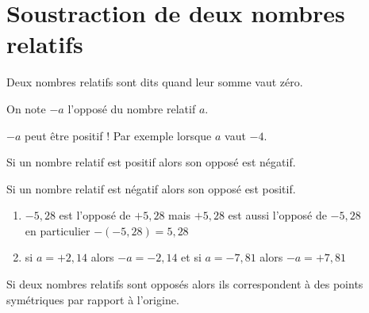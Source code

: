 \section{Soustraction de deux nombres relatifs}
\begin{definition}
    Deux nombres relatifs sont dits  quand leur somme vaut zéro.
\end{definition}

\begin{notation}
    On note $-a$ l'opposé du nombre relatif $a$.
\end{notation}

\begin{remarque}
    $-a$ peut être positif ! Par exemple lorsque $a$ vaut $-4$.
\end{remarque}

\begin{propriete}[\admise]
    Si un nombre relatif est positif alors son opposé est négatif.
\end{propriete}

\begin{propriete}[\admise]
    Si un nombre relatif est négatif alors son opposé est positif.
\end{propriete}

\begin{exemple*1}
    \begin{enumerate}
        \item $-5,28$ est l'opposé de $+5,28$ mais $+5,28$ est aussi l'opposé de $-5,28$ \\en particulier $-(-5,28)=5,28$
        \item si $a=+2,14$ alors $-a=-2,14$ et si $a=-7,81$ alors $-a=+7,81$
    \end{enumerate}
\end{exemple*1}

\begin{propriete}
    Si deux nombres relatifs sont opposés alors ils correspondent à des points symétriques par rapport à l'origine.
\end{propriete}

